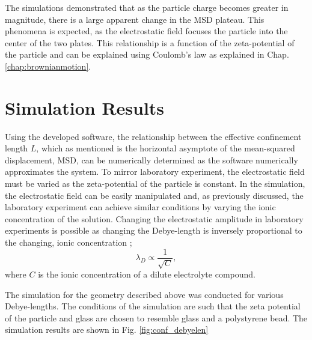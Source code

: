 The simulations demonstrated that as the particle charge becomes greater in magnitude, there is a large apparent change in the MSD plateau. This phenomena is expected, as the electrostatic field focuses the particle into the center of the two plates. This relationship is a function of the zeta-potential of the particle and can be explained using Coulomb's law as explained in Chap. \ref{chap:brownianmotion}. 


\clearpage
\section{Simulation Results}

Using the developed software, the relationship between the effective confinement length $L$, which as mentioned is the horizontal asymptote of the mean-squared displacement, $\mathrm{MSD}$,  can be numerically determined as the software numerically approximates the system. To mirror laboratory experiment, the electrostatic field must be varied as the zeta-potential of the particle is constant. In the simulation, the electrostatic field can be easily manipulated and, as previously discussed, the laboratory experiment can achieve similar conditions by varying the ionic concentration of the solution. Changing the electrostatic amplitude in laboratory experiments is possible as changing the Debye-length is inversely proportional to the changing, ionic concentration \cite{israelachviliIntermolecularSurfaceForces};
\begin{equation}
    \lambda_D \propto \frac{1}{\sqrt{C}},
\end{equation}
where $C$ is the ionic concentration of a dilute electrolyte compound.

The simulation for the geometry described above was conducted for various Debye-lengths. The conditions of the simulation are such that the zeta potential of the particle and glass are chosen to resemble glass and a polystyrene bead.  The simulation results are shown in Fig. \ref{fig:conf_debyelen}

